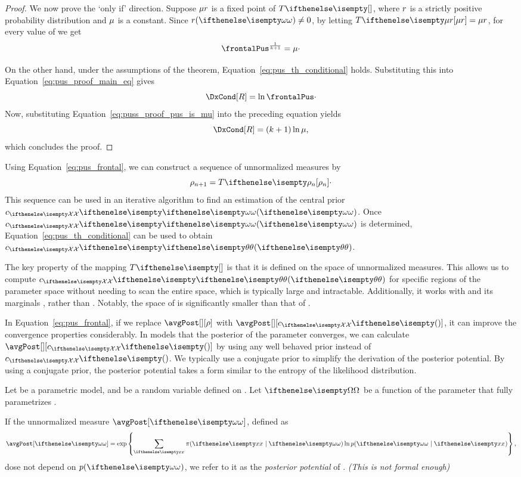 \begin{proof}
    We now prove the `only if' direction.
    Suppose $\mu r$ is a fixed point of $\fpMap{}$, where $r$ is a strictly positive probability
    distribution and $\mu$ is a constant.
    Since $\solPrior(\w) \neq 0$, by letting $\fpMap{\fixedPoint} = \fixedPoint$, for every value of \w we get
    \begin{equation}
        \label{eq:puss_proof_pus_is_mu}
        \frontalPus^{\frac{1}{k+1}} = \normConst \cdot
    \end{equation}

    On the other hand, under the assumptions of the theorem, Equation~\ref{eq:pus_th_conditional} holds.
    Substituting this into Equation~\ref{eq:pus_proof_main_eq} gives
    \[
        \DxCond[\solDist] = \ln \frontalPus \cdot
    \]
    Now, substituting Equation~\ref{eq:puss_proof_pus_is_mu} into the preceding equation yields
    \[
        \DxCond[\solDist] = (k + 1) \ln \normConst,
    \]
    which concludes the proof.
\end{proof}


Using Equation~\ref{eq:pus_frontal}, we can construct a sequence of unnormalized measures by
\[\rho_{n+1} = \fpMap{\rho_n} \cdot \]
This sequence can be used in an iterative algorithm to find an estimation of the central prior $\cMass{\w}$.
Once $\cMass{\w}$ is determined, Equation~\ref{eq:pus_th_conditional} can be used to obtain $\cMass{\paramValue{}}$.

The key property of the mapping $\fpMap{}$ is that it is defined on the space of unnormalized measures.
This allows us to compute $\cMass{\paramValue}$ for
specific regions of the parameter space without needing to scan the entire space, which is typically large and intractable.
Additionally, it works with \w and its marginals \w[i], rather than \paramValue.
Notably, the space of \w is significantly smaller than that of \paramValue.

In Equation~\ref{eq:pus_frontal}, if we replace $\avgPost[][\rho]$ with $\avgPost[][\cMass{}]$, it can improve the
convergence properties considerably.
In models that the posterior of the parameter converges, we can calculate $\avgPost[][\cMass{}]$ by using any well
behaved prior instead of $\cMass{}$.
We typically use a conjugate prior to simplify the derivation of the posterior potential.
By using a conjugate prior, the posterior potential takes a form similar to the entropy of the likelihood distribution.


\begin{definition}
    Let \pmodel be a parametric model, and \X be a random variable defined on .
    Let $\W$ be a function of the parameter \param that fully parametrizes \X.

    If the unnormalized measure $\avgPost[\w]$, defined as
    \begin{equation*}
        \avgPost[\w] = \avgPostExpand[p]{\w}{\x},
    \end{equation*}
    dose not depend on $p(\w)$, we refer to it as the \emph{posterior potential} of \w.
    \emph{(This is not formal enough)}
\end{definition}

